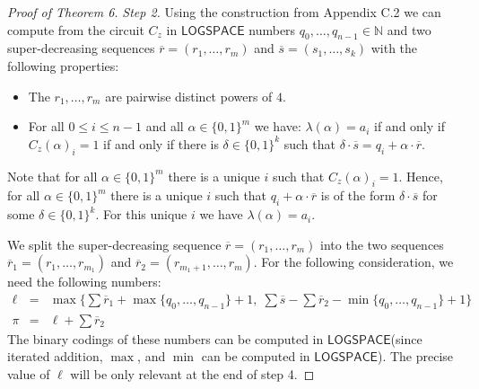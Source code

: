 \documentclass[10pt,a4paper]{article}
\renewcommand{\L}{\ensuremath{\mathsf{LOGSPACE}}\xspace}
\begin{document}
\begin{proof}[Proof of Theorem 6]
\medskip
\noindent
{\em Step 2.}
Using the construction from Appendix C.2 we can compute from the  
circuit $C_z$ in \L numbers $q_{0}, \ldots, q_{n-1} \in \mathbb{N}$ and two super-decreasing sequences 
$\overline{r} = (r_1, \ldots, r_m)$ and $\overline{s} =(s_1, \ldots, s_k)$ with the following properties:
\begin{itemize}
\item The $r_1, \ldots, r_m$ are pairwise distinct powers of $4$. 
\item For all $0 \leq i \leq n-1$ and all $\alpha \in \{0,1\}^m$ we have:
$\lambda(\alpha) = a_i$ if and only if
$C_z(\alpha)_i = 1$  if and only if there is $\delta \in \{0,1\}^k$ such that $\delta \cdot \overline{s} = q_{i} + \alpha \cdot \overline{r}$. 
\end{itemize}
Note that for all $\alpha \in \{0,1\}^m$ there is a unique $i$ such that $C_z(\alpha)_i = 1$.
Hence, for all  $\alpha \in \{0,1\}^m$ there is a unique $i$ such that $q_{i} + \alpha \cdot \overline{r}$ is of the form 
$\delta \cdot \overline{s}$ for some $\delta \in \{0,1\}^k$. For this unique $i$ we have $\lambda(\alpha) = a_i$.

We split the super-decreasing sequence $\overline{r} = (r_1, \ldots, r_m)$ into the two
sequences $\overline{r}_1 = (r_1, \ldots, r_{m_1})$ and $\overline{r}_2 = (r_{m_1+1}, \ldots, r_m)$.
For the following consideration, we need the following numbers:
\begin{eqnarray}
\ell & = & \textstyle \max\big\{ \sum \overline{r}_1 + \max\{q_0, \ldots, q_{n-1}\}+1, \; \sum\overline{s} - \sum\overline{r}_2 - \min \{q_0, \ldots, q_{n-1}\}+1\big\} \label{eq:l} \\
\pi &= & \textstyle \ell + \sum \overline{r}_2 
\end{eqnarray}
The binary codings of these numbers can be computed in \L (since iterated addition, $\max$, and $\min$ can be computed in \L).
The precise value of $\ell$ will be only relevant at the end of step 4.


\end{proof}
\end{document}
